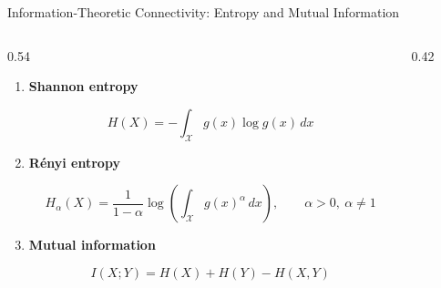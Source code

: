 \documentclass[aspectratio=169]{beamer}
\let\oldcite\cite
\renewcommand{\cite}[1]{{\tiny\oldcite{#1}}}
\begin{document}
\begin{frame}{Information-Theoretic Connectivity: Entropy and Mutual Information}

\scriptsize
\setlength{\abovedisplayskip}{3pt}
\setlength{\belowdisplayskip}{3pt}
\setlength{\jot}{2pt}

\begin{columns}[T,totalwidth=\textwidth]

\begin{column}{0.54\textwidth}

\begin{enumerate}
\setlength{\itemsep}{0.16cm}

\item \textbf{Shannon entropy}
{\scriptsize \cite{shannon1948mathematical}}

\[
H(X)=-\int_{\mathcal{X}} g(x)\log g(x)\,dx
\]

\item \textbf{Rényi entropy}
{\scriptsize \cite{renyi1961measures}}

\[
H_{\alpha}(X)=
\frac{1}{1-\alpha}
\log\!\left(
\int_{\mathcal{X}} g(x)^{\alpha}\,dx
\right),
\qquad
\alpha>0,\ \alpha\neq 1
\]

\item \textbf{Mutual information}
{\scriptsize \cite{cover2006elements}}

\[
I(X;Y)=H(X)+H(Y)-H(X,Y)
\]

\end{enumerate}

\end{column}

\begin{column}{0.42\textwidth}
\centering



\end{column}
\end{columns}
\end{frame}
\end{document}
